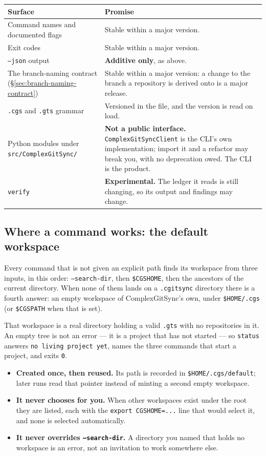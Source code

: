 \begin{center}
\begin{tabular}{lp{9.0cm}}
\textbf{Surface} & \textbf{Promise} \\
\hline
Command names and documented flags & Stable within a major version. \\
Exit codes & Stable within a major version. \\
\texttt{--json} output & \textbf{Additive only}, as above. \\
The branch-naming contract (\S\ref{sec:branch-naming-contract}) & Stable
  within a major version: a change to the branch a repository is derived onto
  is a major release. \\
\texttt{.cgs} and \texttt{.gts} grammar & Versioned in the file, and the
  version is read on load. \\
Python modules under \texttt{src/ComplexGitSync/} & \textbf{Not a public
  interface.} \texttt{ComplexGitSyncClient} is the CLI's own
  implementation; import it and a refactor may break you, with no
  deprecation owed. The CLI is the product. \\
\texttt{verify} & \textbf{Experimental.} The ledger it reads is still
  changing, so its output and findings may change. \\
\end{tabular}
\end{center}

\subsection{Where a command works: the default workspace}

Every command that is not given an explicit path finds its workspace from
three inputs, in this order: \texttt{--search-dir}, then
\texttt{\$CGSHOME}, then the ancestors of the current directory. When none
of them lands on a \texttt{.cgitsync} directory there is a fourth answer: an
empty workspace of ComplexGitSync's own, under \texttt{\$HOME/.cgs} (or
\texttt{\$CGSPATH} when that is set).

That workspace is a real directory holding a valid \texttt{.gts} with no
repositories in it. An empty tree is not an error --- it is a project that
has not started --- so \texttt{status} answers \texttt{no living project
yet}, names the three commands that start a project, and exits \texttt{0}.

\begin{itemize}
  \item \textbf{Created once, then reused.} Its path is recorded in
        \texttt{\$HOME/.cgs/default}; later runs read that pointer instead
        of minting a second empty workspace.
  \item \textbf{It never chooses for you.} When other workspaces exist
        under the root they are listed, each with the
        \texttt{export CGSHOME=...} line that would select it, and none is
        selected automatically.
  \item \textbf{It never overrides \texttt{--search-dir}.} A directory you
        named that holds no workspace is an error, not an invitation to work
        somewhere else.
\end{itemize}

